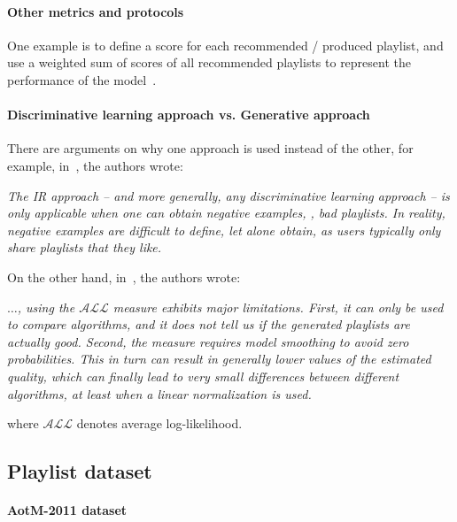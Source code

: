 \paragraph{Other metrics and protocols}
One example is to define a score for each recommended / produced playlist, 
and use a weighted sum of scores of all recommended playlists to represent the performance of the model~\cite{platt2002learning}.

\paragraph{Discriminative learning approach vs. Generative approach}
There are arguments on why one approach is used instead of the other, for example, in~\cite{mcfee2011natural}, the authors wrote:
\begin{center}
\begin{minipage}[c]{.9\textwidth}
\it
The IR approach -- and more generally, any discriminative learning approach -- is only applicable when one can obtain negative examples, 
\ie, bad playlists. In reality, negative examples are difficult to define, let alone obtain, as users typically only share playlists that they like.
\end{minipage}
\end{center}

\noindent
On the other hand, in~\cite{bonnin2015automated}, the authors wrote:
\begin{center}
\begin{minipage}[c]{.9\textwidth}
\it
$\dots$, using the $\mathcal{ALL}$ measure exhibits major limitations.
First, it can only be used to compare algorithms, and it does not tell us if the generated playlists are actually good. 
Second, the measure requires model smoothing to avoid zero probabilities. 
This in turn can result in generally lower values of the estimated quality, 
which can finally lead to very small differences between different algorithms, at least when a linear normalization is used.
\end{minipage}
\end{center}
where $\mathcal{ALL}$ denotes average log-likelihood.


\subsection{Playlist dataset}
\paragraph{AotM-2011 dataset~\cite{mcfee2012hypergraph}}
